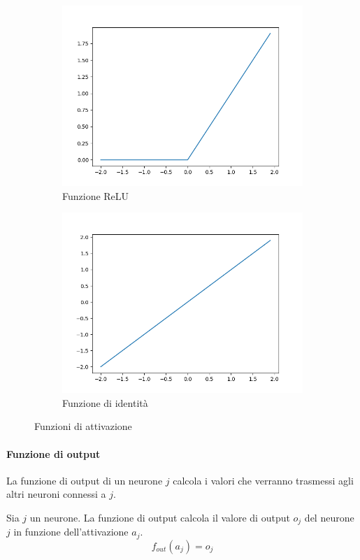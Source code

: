 \documentclass[12pt, twoside, letterpaper]{report}
\begin{document}
\begin{figure}
				\begin{subfigure}[]{.5\textwidth}
					\centering
					\includegraphics[width=0.7\linewidth]{relu.png}
					\caption{Funzione ReLU}
					\label{fig:relu}
				\end{subfigure}
				\hfill
				\begin{subfigure}[]{.5\textwidth}
					\centering
					\includegraphics[width=0.7\linewidth]{identity.png}
					\caption{Funzione di identità}
					\label{fig:identity}
				\end{subfigure}
				
				\caption{Funzioni di attivazione}
				\label{fig:funzioni di attivazione}
			\end{figure}	
			 	
			 \paragraph{Funzione di output} La funzione di output di un neurone $j$ calcola i valori che verranno trasmessi agli altri neuroni connessi a $j$. 
			 
			 	Sia $j$ un neurone. La funzione di output calcola il valore di output $o_j$ del neurone $j$ in funzione dell'attivazione $a_j$. $$f_{out}(a_j) = o_j$$  
			 	
\end{document}
